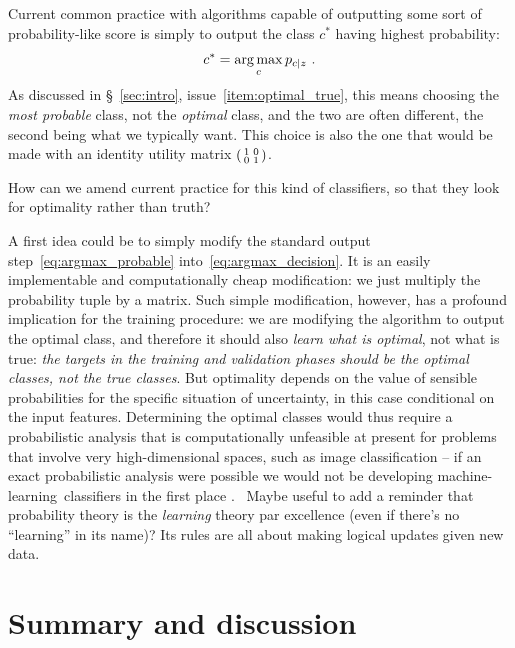 \documentclass[\ifafour a4paper,12pt,\else a5paper,10pt,\fi%
onecolumn,oneside,article,%
british%
]{memoir}
\theoremstyle{remark}
\theoremstyle{innote}
\renewcommand*{\|}[1][]{\nonscript\:#1\vert\nonscript\:\mathopen{}}
\newcommand*{\sect}{\S}%
\newcommand*{\chaps}{chs}%
\newcommand*{\puzzle}{{\fontencoding{U}\fontfamily{fontawesometwo}\selectfont\symbol{225}}}
\newcommand{\mynoteu}[1]{{\footnotesize\color{notecolour}\puzzle\ #1}}
\DeclareMathOperator*{\argmax}{arg\,max}
\newcommand*{\ml}{machine-learning}
\begin{document}
Current common practice with algorithms capable of outputting some sort of probability-like score is simply to output the class $c^{*}$ having highest probability:
\begin{equation}
  \label{eq:argmax_probable}
  c^{*} = \argmax_{c} p_{c\|z} \ .
\end{equation}
As discussed in \sect~\ref{sec:intro}, issue~\ref{item:optimal_true}, this means choosing the \emph{most probable} class, not the \emph{optimal} class, and the two are often different, the second being what we typically want. This choice is also the one that would be made with an identity utility matrix $\begin{psmallmatrix} 1&0\\0&1 \end{psmallmatrix}$.

How can we amend current practice for this kind of classifiers, so that they look for optimality rather than truth?

A first idea could be to simply modify the standard output step~\eqref{eq:argmax_probable} into~\eqref{eq:argmax_decision}. It is an easily implementable and computationally cheap modification: we just multiply the probability tuple by a matrix. Such simple modification, however, has a profound implication for the training procedure: we are modifying the algorithm to output the optimal class, and therefore it should also \emph{learn what is optimal}, not what is true: \emph{the targets in the training and validation phases should be the optimal classes, not the true classes}. But optimality depends on the value of sensible probabilities for the specific situation of uncertainty, in this case conditional on the input features. Determining the optimal classes would thus require a probabilistic analysis that is computationally unfeasible at present for problems that involve very high-dimensional spaces, such as image classification -- if an exact probabilistic analysis were possible we would not be developing \ml\ classifiers in the first place \autocites[\chaps~2, 12]{russelletal1995_r2022}{pearl1988}. \mynoteu{Maybe useful to add a reminder that probability theory is the \emph{learning} theory par excellence (even if there's no \enquote{learning} in its name)? Its rules are all about making logical updates given new data.}




\section{Summary and discussion}
\label{sec:summary_discussion}
\end{document}
